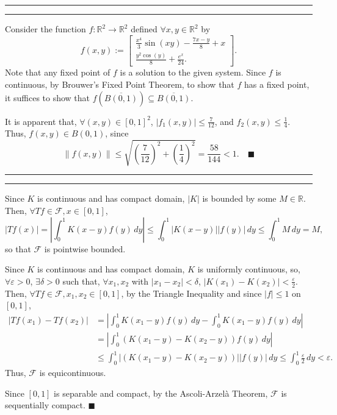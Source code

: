 \documentclass[11pt]{article}
\newcounter{questionCounter}
\newcounter{partCounter}[questionCounter]
\newenvironment{question}[2][\arabic{questionCounter}]{%
    \setcounter{partCounter}{0}%
    \vspace{.25in} \hrule \vspace{0.5em}%
        \noindent{\bf #2}%
    \vspace{0.8em} \hrule \vspace{.10in}%
    \addtocounter{questionCounter}{1}%
}{}
\renewcommand{\qed}{\quad $\blacksquare$}
\newcommand{\mqed}{\quad \blacksquare}
\newcommand{\R}{\mathbb{R}} %
\newcommand{\e}{\varepsilon} %
\begin{document}
\begin{question}{Problem 5}
Consider the function $f: \R^2 \rightarrow \R^2$ defined $\forall x,y \in \R^2$
by
\[f(x,y)
:=
    \left[
        \begin{array}{c}
            \frac{x^4}{3}\sin(xy) - \frac{7x - y}{8} + x \\
            \frac{y^2\cos(y)}{8} + \frac{e^x}{24}.
        \end{array}
    \right].
\]
Note that any fixed point of $f$ is a solution to the given system. Since
$f$ is continuous, by Brouwer's Fixed Point Theorem, to show that $f$ has a
fixed point, it suffices to show that
$f(\overline{B(0,1)}) \subseteq \overline{B(0,1)}$.

It is apparent that, $\forall (x,y) \in [0,1]^2$,
$|f_1(x,y)| \leq \frac{7}{12}$, and $f_2(x,y) \leq \frac14$. Thus,
$f(x,y) \in B(0,1)$, since
\[\|f(x,y)\|
 \leq \sqrt{\left( \frac{7}{12} \right)^2 + \left( \frac14 \right)^2}
 = \frac{58}{144}
 < 1. \mqed
\]
\end{question}

\newpage
\begin{question}{Problem 6}
Since $K$ is continuous and has compact domain, $|K|$ is bounded by some $M \in
\R$. Then, $\forall Tf \in \mathcal{F}, x \in [0,1]$,
\[|Tf(x)|
 =    \left|\int_0^1 K(x - y) f(y) \, dy \right|
 \leq \int_0^1 |K(x - y)| |f(y)| \, dy
 \leq \int_0^1 M \, dy
 = M,
\]
so that $\mathcal{F}$ is pointwise bounded.

Since $K$ is continuous and has compact domain, $K$ is uniformly continuous,
so, $\forall \e > 0$, $\exists \delta > 0$ such that, $\forall x_1,x_2$
with $|x_1 - x_2| < \delta$, $|K(x_1) - K(x_2)| < \frac{\e}{2}$. Then,
$\forall Tf \in \mathcal{F}, x_1,x_2 \in [0,1]$, by the Triangle Inequality and
since $|f| \leq 1$ on $[0,1]$,
\begin{align*}
|Tf(x_1) - Tf(x_2)|
 & =    \left|\int_0^1 K(x_1 - y)f(y) \, dy
                                    - \int_0^1 K(x_1 - y)f(y) \, dy\right| \\
 & =    \left|\int_0^1 (K(x_1 - y) - K(x_2 - y))f(y) \, dy\right| \\
 & \leq \int_0^1 \left|(K(x_1 - y) - K(x_2 - y))\right||f(y)| \, dy
   \leq \int_0^1 \frac{\e}{2} \, dy
   <    \e.
\end{align*}
Thus, $\mathcal{F}$ is equicontinuous.

Since $[0,1]$ is separable and compact, by the Ascoli-Arzel\`{a} Theorem,
$\mathcal{F}$ is sequentially compact. \qed
\end{question}
\end{document}
